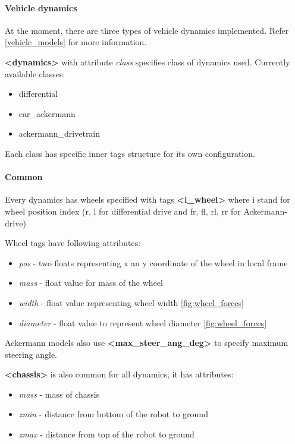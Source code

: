 \documentclass[a4paper,11pt]{article}
\begin{document}
\paragraph{Vehicle dynamics}
At the moment, there are three types of vehicle dynamics implemented. Refer  \ref{vehicle_models} for more information. 

\textbf{\textless dynamics\textgreater} with attribute \textit{class} specifies class of dynamics used. Currently available classes: 
\begin{itemize}
	\item differential
	\item car\_ackermann
	\item ackermann\_drivetrain
\end{itemize}

Each class has specific inner tags structure for its own configuration. 

\paragraph{Common} Every dynamics has wheels specified with tags \textbf{\textless i\_wheel\textgreater} where i stand for wheel position index (r, l for differential drive and fr, fl, rl, rr for Ackermann-drive)

Wheel tags have following attributes:
\begin{itemize}
	\item \textit{pos} - two floats representing x an y coordinate of the wheel in local frame
	\item \textit{mass} - float value for mass of the wheel
	\item \textit{width} - float value representing wheel width \ref{fig:wheel_forces}
	\item \textit{diameter} - float value to represent wheel diameter \ref{fig:wheel_forces}
\end{itemize}

Ackermann models also use \textbf{\textless max\_steer\_ang\_deg\textgreater} to specify maximum steering angle.


\textbf{\textless chassis\textgreater} is also common for all dynamics, it has attributes:

\begin{itemize}
	\item \textit{mass} - mass of chassis
	\item \textit{zmin} - distance from bottom of the robot to ground
	\item \textit{zmax} - distance from top of the robot to ground
\end{itemize}
\end{document}
